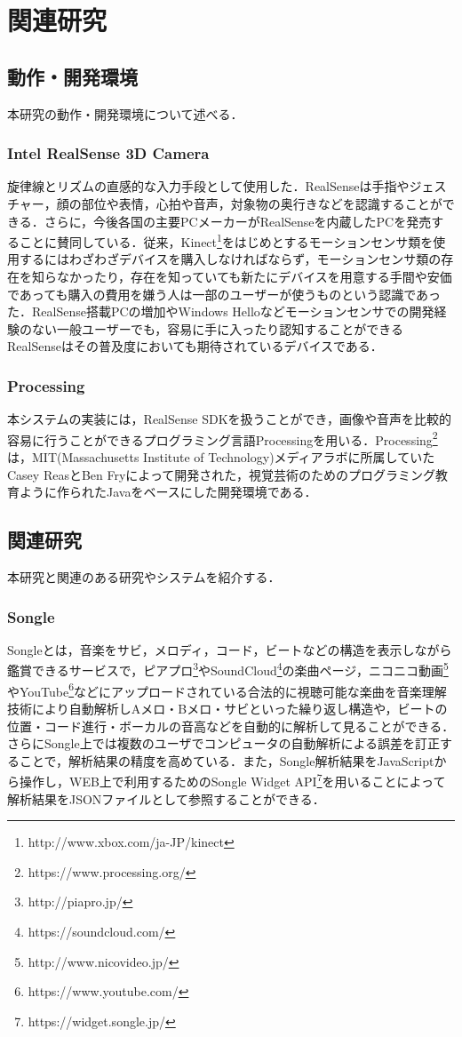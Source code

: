 \chapter{関連研究}
\section{動作・開発環境}
本研究の動作・開発環境について述べる．

\subsection{Intel RealSense 3D Camera}
旋律線とリズムの直感的な入力手段として使用した．RealSenseは手指やジェスチャー，顔の部位や表情，心拍や音声，対象物の奥行きなどを認識することができる．さらに，今後各国の主要PCメーカーがRealSenseを内蔵したPCを発売することに賛同している．従来，Kinect\footnote{http://www.xbox.com/ja-JP/kinect}をはじめとするモーションセンサ類を使用するにはわざわざデバイスを購入しなければならず，モーションセンサ類の存在を知らなかったり，存在を知っていても新たにデバイスを用意する手間や安価であっても購入の費用を嫌う人は一部のユーザーが使うものという認識であった．RealSense搭載PCの増加やWindows Helloなどモーションセンサでの開発経験のない一般ユーザーでも，容易に手に入ったり認知することができるRealSenseはその普及度においても期待されているデバイスである．

\subsection{Processing}
本システムの実装には，RealSense SDKを扱うことができ，画像や音声を比較的容易に行うことができるプログラミング言語Processingを用いる．Processing\footnote{https://www.processing.org/}は，MIT(Massachusetts Institute of Technology)メディアラボに所属していたCasey ReasとBen Fryによって開発された，視覚芸術のためのプログラミング教育ように作られたJavaをベースにした開発環境である．\cite{takahasi2010}
\section{関連研究}
本研究と関連のある研究やシステムを紹介する．

\subsection{Songle}
Songle\cite{songle}とは，音楽をサビ，メロディ，コード，ビートなどの構造を表示しながら鑑賞できるサービスで，ピアプロ\footnote{http://piapro.jp/}やSoundCloud\footnote{https://soundcloud.com/}の楽曲ページ，ニコニコ動画\footnote{http://www.nicovideo.jp/}やYouTube\footnote{https://www.youtube.com/}などにアップロードされている合法的に視聴可能な楽曲を音楽理解技術により自動解析しAメロ・Bメロ・サビといった繰り返し構造や，ビートの位置・コード進行・ボーカルの音高などを自動的に解析して見ることができる．さらにSongle上では複数のユーザでコンピュータの自動解析による誤差を訂正することで，解析結果の精度を高めている．また，Songle解析結果をJavaScriptから操作し，WEB上で利用するためのSongle Widget API\footnote{https://widget.songle.jp/}を用いることによって解析結果をJSONファイルとして参照することができる．


